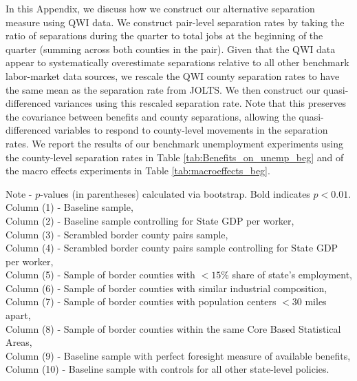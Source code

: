 \documentclass[12pt]{article}
\newcommand{\1}{\mathbf{1}}
\begin{document}
\begin{appendix}
In this Appendix, we discuss how we construct our alternative separation measure using QWI data. We construct pair-level separation rates by taking the ratio of separations during the quarter to total jobs at the beginning of the quarter (summing across both counties in the pair). Given that the QWI data appear to systematically overestimate separations relative to all other benchmark labor-market data sources, we rescale the QWI county separation rates to have the same mean as the separation rate from JOLTS. We then construct our quasi-differenced variances using this rescaled separation rate. Note that this preserves the covariance between benefits and county separations, allowing the quasi-differenced variables to respond to county-level movements in the separation rates. We report the results of our benchmark unemployment experiments using the county-level separation rates  in Table \ref{tab:Benefits_on_unemp_beg} and of the macro effects experiments in Table \ref{tab:macroeffects_beg}.

\begin{table}[H]
  \centering
  
   \caption{Unemployment Benefit Extensions and Unemployment: QWI Separations}\label{tab:Benefits_on_unemp_beg}
   
\small

\parbox{16.5cm}{\noindent Note - $p$-values (in parentheses) calculated via bootstrap. Bold indicates $p<0.01$.\\
Column (1) - Baseline sample,\\
Column (2) - Baseline sample controlling for State GDP per worker,\\
Column (3) - Scrambled border county pairs sample,\\
Column (4) - Scrambled border county pairs sample controlling for State GDP per worker,\\
Column (5) - Sample of border counties with  $<15\%$ share of state's employment,\\
Column (6) - Sample of border counties with similar industrial composition,\\
Column (7) - Sample of border counties with population centers $<30$ miles apart,\\
Column (8) - Sample of border counties within the same Core Based Statistical Areas,\\
Column (9) - Baseline sample with perfect foresight measure of available benefits,\\
Column (10) - Baseline sample with controls for all other state-level policies.
}
\vspace{-0.0cm}
\end{table}




\end{appendix}
\end{document}
